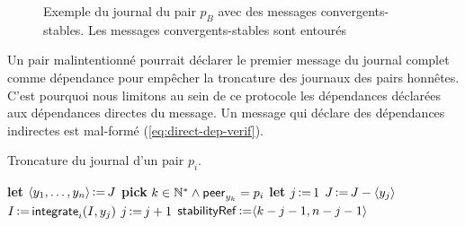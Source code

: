 \begin{figure}[hbt]
\centering
{}
\caption[Journal d'un pair $p_B$ avec des messages convergents-stables]{Exemple du journal du pair $p_B$ avec des messages convergents-stables.
Les messages convergents-stables sont entourés}\label{fig:log-stability-example-b}
\end{figure}

Un pair malintentionné pourrait déclarer le premier message du journal complet comme dépendance pour empêcher la troncature des journaux des pairs honnêtes.
C'est pourquoi nous limitons au sein de ce protocole les dépendances déclarées aux dépendances directes du message.
Un message qui déclare des dépendances indirectes est mal-formé (\autoref{eq:direct-dep-verif}).

\begin{algorithm}[ht]
\caption[Troncature du journal d'un pair]{Troncature du journal d'un pair $p_i$.}\label{alg:log-truncation}
\begin{algorithmic}[1]
    \State \textbf{let} $\tuple*{y_1, \dotsc, y_n} \assign J$
    \State \textbf{pick} $k \in \mathbb{N}^* \land \trm{peer}_{y_k} = p_i$
        \State \textbf{let} $j \assign 1$
            \State $J \assign J \sminus \tuple*{y_j}$ 
            \State $I \assign \trm{integrate}_i(I, y_j)$ 
            \State $j \assign j + 1$ 
        \EndWhile
        \State $\trm{stabilityRef} \assign \tuple*{k - j - 1, n - j - 1}$ 
    \EndIf
\EndProcedure
\end{algorithmic}
\end{algorithm}


